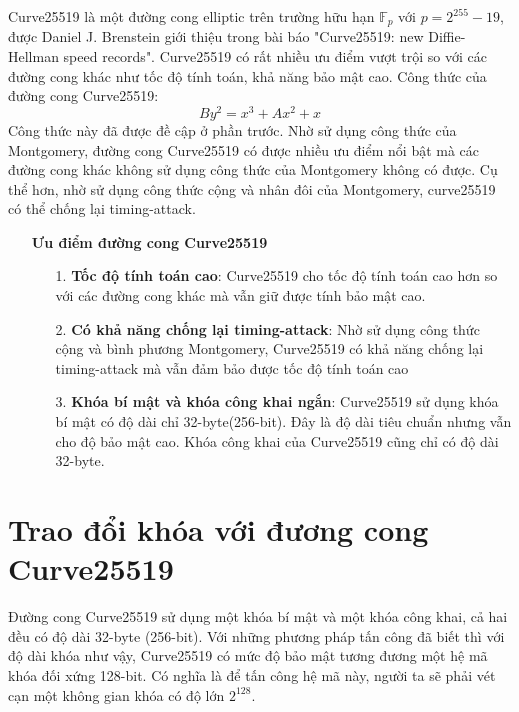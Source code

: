 \documentclass[a4paper,12pt]{report}
\begin{document}
Curve25519 là một đường cong elliptic trên trường hữu hạn $\mathbb{F}_p$ với $p = 2^{255} - 19$, được Daniel J. Brenstein giới thiệu trong bài báo "Curve25519: new Diffie-Hellman speed records". Curve25519 có rất nhiều ưu điểm vượt trội so với các đường cong khác như tốc độ tính toán,
khả năng bảo mật cao. Công thức của đường cong Curve25519:
\begin{displaymath}
By^2 = x^3 + Ax^2 + x
\end{displaymath}
Công thức này đã được đề cập ở phần trước. Nhờ sử dụng công thức của Montgomery, đường cong Curve25519 có được nhiều ưu điểm nổi bật mà các đường cong khác không sử dụng công thức của Montgomery không có được. Cụ
thể hơn, nhờ sử dụng công thức cộng và nhân đôi của Montgomery, curve25519 có thể chống lại timing-attack.
\begin{itemize}
\item[] \textbf{Ưu điểm đường cong Curve25519}
\begin{itemize}
\item[1. ] \textbf{Tốc độ tính toán cao}: Curve25519 cho tốc độ tính toán cao hơn so với các đường cong khác mà vẫn giữ được tính bảo mật cao.
\item[2. ] \textbf{Có khả năng chống lại timing-attack}: Nhờ sử dụng công thức cộng và bình phương Montgomery, Curve25519 có khả năng chống lại timing-attack mà vẫn đảm bảo được tốc độ tính toán cao
\item[3. ] \textbf{Khóa bí mật và khóa công khai ngắn}: Curve25519 sử dụng khóa bí mật có độ dài chỉ 32-byte(256-bit). Đây là độ dài tiêu chuẩn nhưng vẫn cho độ bảo mật cao. Khóa công khai của Curve25519 cũng chỉ có độ dài 32-byte.
\end{itemize}
\end{itemize}
\section{Trao đổi khóa với đương cong Curve25519}
Đường cong Curve25519 sử dụng một khóa bí mật và một khóa công khai, cả hai đều có độ dài 32-byte (256-bit). Với những phương pháp tấn công đã biết thì với độ dài khóa như vậy, Curve25519 có mức độ bảo mật tương đương một hệ mã khóa đối xứng 128-bit. Có nghĩa là để tấn công hệ mã này, người ta sẽ phải vét cạn một không gian khóa có độ lớn $2^128$.
\end{document}
